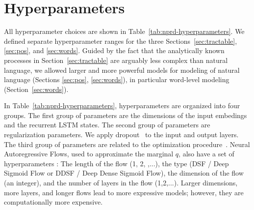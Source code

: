 \documentclass[entropy,article,submit,moreauthors,pdftex,10pt,a4paper]{Definitions/mdpi}
\begin{document}

\appendix
\section{Hyperparameters}\label{sec:app-hyperparams}

All hyperparameter choices are shown in Table~\ref{tab:nprd-hyperparameters}.
We defined separate hyperparameter ranges for the three Sections~\ref{sec:tractable}, \ref{sec:pos}, and \ref{sec:words}.
Guided by the fact that the analytically known processes in Section~\ref{sec:tractable} are arguably less complex than natural language, we allowed larger and more powerful models for modeling of natural language (Sections \ref{sec:pos}, \ref{sec:words}), in particular word-level modeling (Section~\ref{sec:words}).

In Table~\ref{tab:nprd-hyperparameters}, hyperparameters are organized into four groups.
The first group of parameters are the dimensions of the input embedings and the recurrent LSTM states.
The second group of parameters are regularization parameters.
We apply dropout~\citep{srivastava-dropout:-2014} to the input and output layers.
The third group of parameters are related to the optimization procedure~\citep{kingma-adam:-2014}.
Neural Autoregressive Flows, used to approximate the marginal $q$, also have a set of hyperparameters \citep{huang-neural-2018}: The length of the flow (1, 2, ,...), the type (DSF / Deep Sigmoid Flow or  DDSF / Deep Dense Sigmoid Flow), the dimension of the flow (an integer), and the number of layers in the flow (1,2,...).
Larger dimensions, more layers, and longer flows lead to more expressive models; however, they are computationally more expensive.
\end{document}
